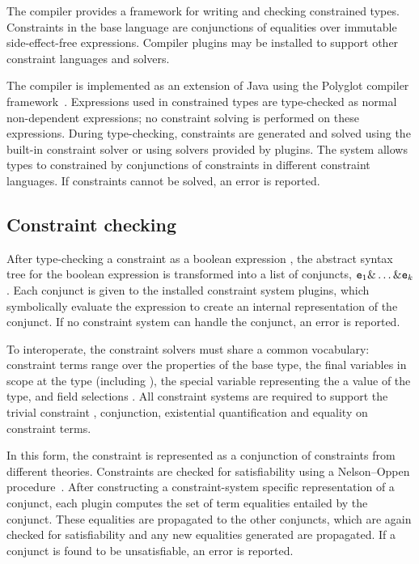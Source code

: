 %

The \Xten{} compiler provides a framework for writing and
checking constrained types.  
Constraints in the base \Xten{} language are conjunctions
of equalities over immutable side-effect-free expressions.
Compiler plugins may be installed
to support other constraint languages and solvers.

The \Xten{} compiler is implemented as an extension of
Java using the Polyglot compiler framework~\cite{ncm03}.
Expressions used in constrained
types are type-checked as normal non-dependent \Xten{} expressions;
no constraint solving is performed on these expressions.
During type-checking, constraints are generated and solved using
the built-in constraint solver or using solvers provided by
plugins.  The system allows types to constrained by conjunctions
of constraints in different constraint languages.
If constraints cannot be solved, an error is reported.

\subsection{Constraint checking}

After type-checking a constraint as a boolean expression ,
the abstract syntax tree for
the boolean expression is transformed into a list of conjuncts,
${\tt e}_1 \& \dots \& {\tt e}_k$.  Each conjunct  is given to 
the installed constraint system plugins, which symbolically
evaluate the expression to create an internal representation of
the conjunct.  If no
constraint system can handle the conjunct, an error is reported.

To interoperate, the constraint solvers must share a common
vocabulary: constraint terms  range over the properties of the
base type, the final variables in scope at the type (including
), the special variable  representing
the a value of the type, and field selections .
All
constraint systems are required to support the trivial
constraint
, conjunction, existential quantification and equality on
constraint terms.


In this form, the constraint is represented as a 
conjunction of constraints from different theories.  Constraints
are checked for satisfiability using a Nelson--Oppen
procedure~\cite{nelson-oppen}.
After constructing a constraint-system specific 
representation of a conjunct, each plugin computes the set of
term equalities entailed by the conjunct.  These equalities are
propagated to the other conjuncts, which are again checked for
satisfiability and any new equalities generated are propagated.
If a conjunct is found to be unsatisfiable, an error is
reported. 

